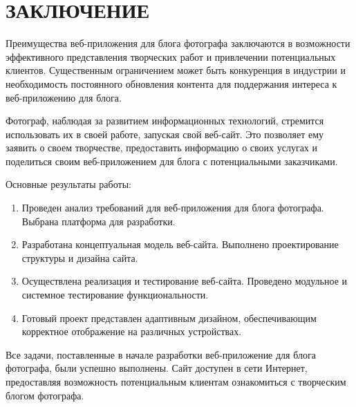 \section*{ЗАКЛЮЧЕНИЕ}

Преимущества веб-приложения для блога фотографа заключаются в возможности эффективного представления творческих работ и привлечении потенциальных клиентов. Существенным ограничением может быть конкуренция в индустрии и необходимость постоянного обновления контента для поддержания интереса к веб-приложению для блога.

Фотограф, наблюдая за развитием информационных технологий, стремится использовать их в своей работе, запуская свой веб-сайт. Это позволяет ему заявить о своем творчестве, предоставить информацию о своих услугах и поделиться своим веб-приложением для блога с потенциальными заказчиками.

Основные результаты работы:

\begin{enumerate}
	\item Проведен анализ требований для веб-приложения для блога фотографа. Выбрана платформа для разработки.
	\item Разработана концептуальная модель веб-сайта. Выполнено проектирование структуры и дизайна сайта.
	\item Осуществлена реализация и тестирование веб-сайта. Проведено модульное и системное тестирование функциональности.
	\item Готовый проект представлен адаптивным дизайном, обеспечивающим корректное отображение на различных устройствах.
\end{enumerate}

Все задачи, поставленные в начале разработки веб-приложение для блога фотографа, были успешно выполнены. Сайт доступен в сети Интернет, предоставляя возможность потенциальным клиентам ознакомиться с творческим блогом фотографа.